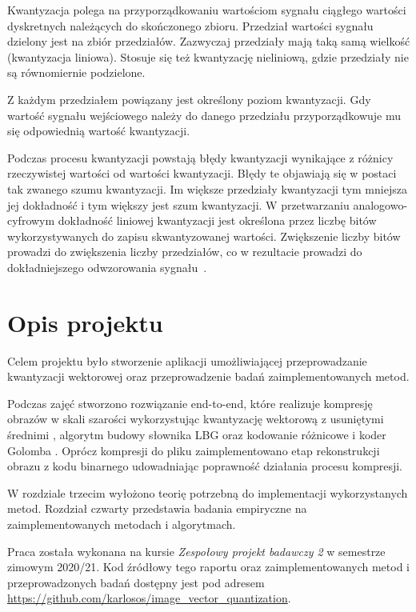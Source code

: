 \documentclass{article}
\begin{document}
Kwantyzacja polega na przyporządkowaniu wartościom sygnału ciągłego wartości dyskretnych należących do skończonego zbioru.
Przedział wartości sygnału dzielony jest na zbiór przedziałów.
Zazwyczaj przedziały mają taką samą wielkość (kwantyzacja liniowa).
Stosuje się też kwantyzację nieliniową, gdzie przedziały nie są równomiernie podzielone.

Z każdym przedziałem powiązany jest określony poziom kwantyzacji.
Gdy wartość sygnału wejściowego należy do danego przedziału przyporządkowuje mu się odpowiednią wartość kwantyzacji.

Podczas procesu kwantyzacji powstają błędy kwantyzacji wynikające z różnicy rzeczywistej wartości od wartości kwantyzacji.
Błędy te objawiają się w postaci tak zwanego szumu kwantyzacji.
Im większe przedziały kwantyzacji tym mniejsza jej dokładność i tym większy jest szum kwantyzacji.
W przetwarzaniu analogowo-cyfrowym dokładność liniowej kwantyzacji jest określona przez liczbę bitów wykorzystywanych do zapisu skwantyzowanej wartości.
Zwiększenie liczby bitów prowadzi do zwiększenia liczby przedziałów, co w rezultacie prowadzi do dokładniejszego odwzorowania \mbox{sygnału \cite{drozdek2007wprowadzenie}.}

\section{Opis projektu}
\label{sec:opis}

Celem projektu było stworzenie aplikacji umożliwiającej przeprowadzanie kwantyzacji wektorowej oraz przeprowadzenie badań
zaimplementowanych metod. 

Podczas zajęć stworzono rozwiązanie end-to-end, które realizuje kompresję obrazów w skali szarości wykorzystując kwantyzację wektorową z usuniętymi średnimi \cite{meanremovedVQ}, algorytm budowy słownika LBG \cite{lbg1980} oraz kodowanie różnicowe \cite{differential_coding} i koder Golomba \cite{golomb}. Oprócz kompresji do pliku zaimplementowano etap rekonstrukcji obrazu z kodu binarnego udowadniając poprawność działania procesu kompresji.

W rozdziale trzecim wyłożono teorię potrzebną do implementacji wykorzystanych metod. Rozdział czwarty przedstawia badania empiryczne na zaimplementowanych metodach i algorytmach. 

Praca została wykonana na kursie \emph{Zespołowy projekt badawczy 2} w semestrze zimowym 2020/21. Kod źródłowy tego raportu oraz zaimplementowanych metod i przeprowadzonych badań dostępny jest pod adresem \url{https://github.com/karlosos/image_vector_quantization}.
\end{document}
